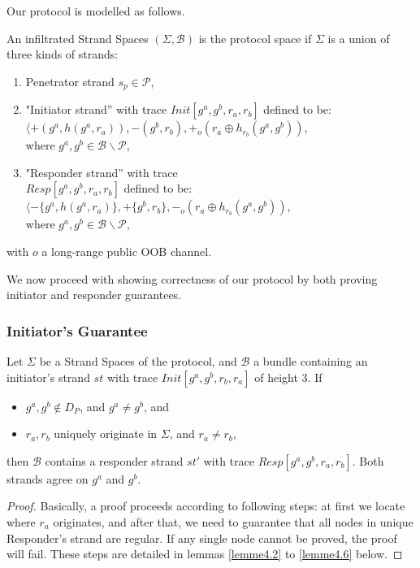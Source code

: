 Our protocol is modelled as follows. 

\begin{Definition}
An infiltrated Strand Spaces $(\Sigma,\mathcal{B})$ is the protocol space if $\Sigma$ is a union of three kinds of strands:
\begin{enumerate}
\item Penetrator strand $s_p \in \mathcal{P}$,
\item "Initiator strand'' with trace {\small $Init[g^a,g^b,r_a,r_b]$} defined to be: \\ 
 {\small $\langle +(g^a,h(g^a,r_a)),-(g^b,r_b),+_o(r_a \oplus h_{r_b}(g^a,g^b))$, \\ where $g^a,g^b \in \mathcal{B} \backslash \mathcal{P}$,}
\item "Responder strand'' with trace\\
 {\small $Resp[g^a,g^b,r_a,r_b]$} defined to be: \\ 
 {\small $\langle -\{g^a,h(g^a,r_a)\},+\{g^b,r_b\}, -_o(r_a \oplus h_{r_b}(g^a,g^b))$, \\ where $g^a,g^b \in \mathcal{B} \backslash \mathcal{P}$,}
\end{enumerate}
with $o$ a long-range public OOB channel.
\end{Definition}

We now proceed with showing correctness of our protocol by both proving initiator and responder guarantees.

\subsubsection{Initiator's Guarantee}

\begin{Proposition}
Let $\Sigma$ be a Strand Spaces of the protocol, and $\mathcal{B}$ a bundle containing an initiator's strand $st$ with trace $Init[g^a,g^b,r_b,r_a]$ of height 3. If
 \begin{itemize}
 \item $g^a,g^b \not\in D_P$, and $g^a \not= g^b$, and
 \item $r_a,r_b$ uniquely originate in $\Sigma$, and $r_a \not= r_b$,
 \end{itemize}
then $\mathcal{B}$ contains a responder strand $st'$ with trace $Resp[g^a,g^b,r_a,r_b]$. Both strands agree on $g^a$ and $g^b$.
\end{Proposition}

\begin{proof}
Basically, a proof proceeds according to following steps: at first we locate where $r_a$ originates, and after that, we need to guarantee that all nodes in unique Responder's strand are regular.
 If any single node cannot be proved, the proof will fail. 
These steps are detailed in lemmas \ref{lemme4.2} to \ref{lemme4.6} below.
\end{proof}

